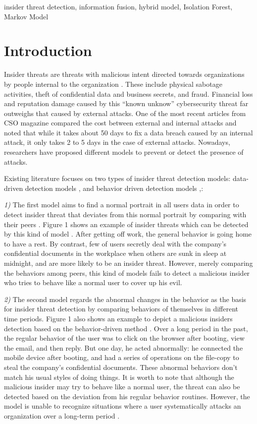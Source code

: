 \documentclass[conference]{IEEEtran}
\begin{document}
\begin{IEEEkeywords}
insider threat detection, information fusion, hybrid model, Isolation Forest, Markov Model
\end{IEEEkeywords}

\section{Introduction}

Insider threats are threats with malicious intent directed towards organizations by people internal to the organization \cite{b1}.
These include physical sabotage activities, theft of confidential data and business secrets, and fraud. Financial loss and reputation damage caused by this ``known unknow'' cybersecurity threat far outweighs that caused by external attacks. One of the most recent articles from CSO magazine \cite{b2} compared the cost between external and internal attacks and noted that while it takes about 50 days to fix a data breach caused by an internal attack, it only takes 2 to 5 days in the case of external attacks. Nowadays, researchers have proposed different models to prevent or detect the presence of attacks.

Existing literature focuses on two types of insider threat detection 
models: data-driven detection models \cite{b3},\cite{b4} and behavior driven detection models \cite{b5},\cite{b6}: 

\noindent \emph{1)} The first model aims to find a normal portrait in all users data in order to detect insider threat that deviates from this normal portrait by comparing with their peers \cite{b7}. Figure 1 shows an example of insider threats which can be detected by this kind of model \cite{b7}. After getting off work, the general behavior is going home to have a rest. By contrast, few of users secretly deal with the company's confidential documents in the workplace when others are sunk in sleep at midnight, and are more likely to be an insider threat. However, merely comparing the behaviors among peers,  this kind of models fails to detect a malicious insider who tries to behave like a normal user to cover up his evil.

\noindent \emph{2)} The second model regards the abnormal changes in the behavior as the basis for insider threat detection by comparing behaviors of themselves in different time periods.
Figure 1 also shows an example to depict a malicious insiders detection based on the behavior-driven method \cite{b8}. Over a long period in the past, the regular behavior of the user was to click on the browser after booting, view the email, and then reply. But one day, he acted abnormally: he connected the mobile device after booting, and had a series of operations on the file-copy to steal the company's confidential documents. These abnormal behaviors don't match his usual styles of doing things. It is worth to note that although the malicious insider may try to behave like a normal user, the threat can also be detected based on the deviation from his regular behavior routines.
However, the model is unable to recognize situations where a user systematically attacks an
organization over a long-term period \cite{b3}. 
\end{document}
